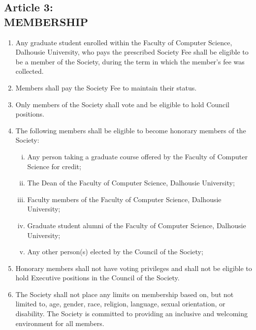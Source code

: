 \documentclass[]{report}
\begin{document}
\clearpage
\begin{center}
	\section*{Article 3:\\MEMBERSHIP}
	\vspace{12px}
\end{center}
\label{membership}

	\renewcommand{\theenumi}{\Alph{enumi}}
	\begin{enumerate}
		\item Any graduate student enrolled within the Faculty of Computer Science, Dalhousie University, who pays the prescribed Society Fee shall be eligible to be a member of the Society, during the term in which the member's fee was collected.
		
		\item Members shall pay the Society Fee to maintain their status.
		
		\item Only members of the Society shall vote and be eligible to hold Council positions.
		
		\item The following members shall be eligible to become honorary members of the Society:
	
		\begin{enumerate}[i.]
		
			\item Any person taking a graduate course offered by the Faculty of Computer Science for credit;
			
			\item The Dean of the Faculty of Computer Science, Dalhousie University;
			
			\item Faculty members of the Faculty of Computer Science, Dalhousie University;
			
			\item Graduate student alumni of the Faculty of Computer Science, Dalhousie University;
			
			\item Any other person(s) elected by the Council of the Society;
			
		\end{enumerate}
	
		\item Honorary members shall not have voting privileges and shall not be eligible to hold Executive positions in the Council of the Society.
		
		\item The Society shall not place any limits on membership based on, but not limited to, age, gender, race, religion, language, sexual orientation, or disability. The Society is committed to providing an inclusive and welcoming environment for all members.
		
	\end{enumerate}
	
\end{document}
